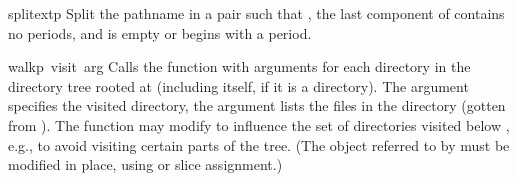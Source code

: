 \begin{funcdesc}{splitext}{p}
Split the pathname  in a pair 
such that ,
the last component of  contains no periods,
and  is empty or begins with a period.
\end{funcdesc}

\begin{funcdesc}{walk}{p\, visit\, arg}
Calls the function  with arguments
 for each directory in the
directory tree rooted at  (including  itself, if it is a
directory).  The argument  specifies the visited directory,
the argument  lists the files in the directory (gotten from
).  The  function may
modify  to influence the set of directories visited below
, e.g., to avoid visiting certain parts of the tree.  (The
object referred to by  must be modified in place, using
 or slice assignment.)
\end{funcdesc}
